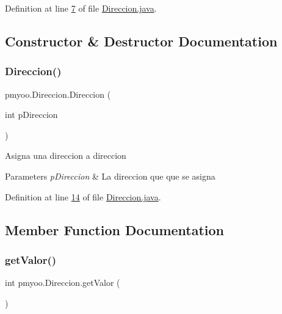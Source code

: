 Definition at line \mbox{\hyperlink{_direccion_8java_source_l00007}{7}} of file \mbox{\hyperlink{_direccion_8java_source}{Direccion.\+java}}.



\subsection{Constructor \& Destructor Documentation}
\mbox{\label{enumpmyoo_1_1_direccion_a9b65d1f2611f2530d3acee9a95a9cd81}} 
\subsubsection{\texorpdfstring{Direccion()}{Direccion()}}
{\footnotesize\ttfamily pmyoo.\+Direccion.\+Direccion (\begin{DoxyParamCaption}\item[{int}]{p\+Direccion }\end{DoxyParamCaption})}

Asigna una direccion a direccion 
\begin{DoxyParams}{Parameters}
{\em p\+Direccion} & La direccion que que se asigna \\
\hline
\end{DoxyParams}


Definition at line \mbox{\hyperlink{_direccion_8java_source_l00014}{14}} of file \mbox{\hyperlink{_direccion_8java_source}{Direccion.\+java}}.



\subsection{Member Function Documentation}
\mbox{\label{enumpmyoo_1_1_direccion_a939a949b6dc8128254357b4f51f745a7}} 
\subsubsection{\texorpdfstring{getValor()}{getValor()}}
{\footnotesize\ttfamily int pmyoo.\+Direccion.\+get\+Valor (\begin{DoxyParamCaption}{ }\end{DoxyParamCaption})}

